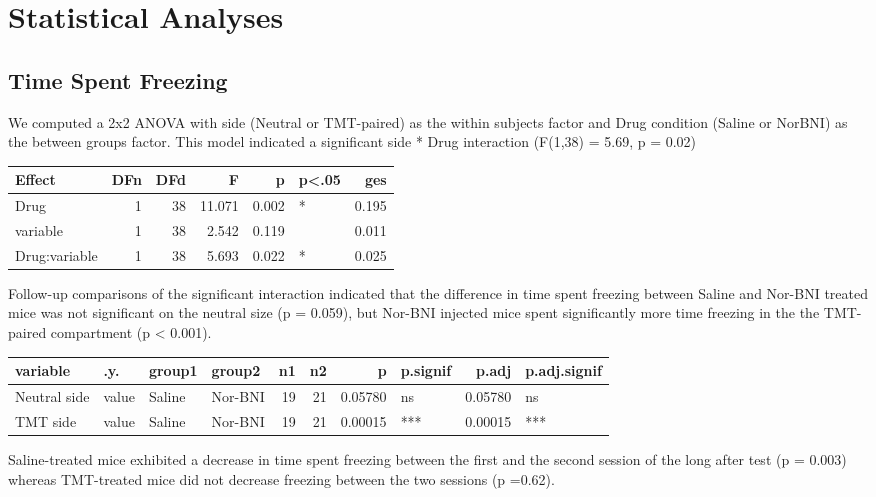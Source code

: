 \documentclass[
]{book}
\begin{document}
\hypertarget{statistical-analyses-3}{%
\section{Statistical Analyses}\label{statistical-analyses-3}}

\hypertarget{time-spent-freezing}{%
\subsection{Time Spent Freezing}\label{time-spent-freezing}}

We computed a 2x2 ANOVA with side (Neutral or TMT-paired) as the within subjects factor and Drug condition (Saline or NorBNI) as the between groups factor. This model indicated a significant side * Drug interaction (F(1,38) = 5.69, p = 0.02)

\begin{tabular}{l|r|r|r|r|l|r}
\hline
Effect & DFn & DFd & F & p & p<.05 & ges\\
\hline
Drug & 1 & 38 & 11.071 & 0.002 & * & 0.195\\
\hline
variable & 1 & 38 & 2.542 & 0.119 &  & 0.011\\
\hline
Drug:variable & 1 & 38 & 5.693 & 0.022 & * & 0.025\\
\hline
\end{tabular}

Follow-up comparisons of the significant interaction indicated that the difference in time spent freezing between Saline and Nor-BNI treated mice was not significant on the neutral size (p = 0.059), but Nor-BNI injected mice spent significantly more time freezing in the the TMT-paired compartment (p \textless{} 0.001).

\begin{tabular}{l|l|l|l|r|r|r|l|r|l}
\hline
variable & .y. & group1 & group2 & n1 & n2 & p & p.signif & p.adj & p.adj.signif\\
\hline
Neutral side & value & Saline & Nor-BNI & 19 & 21 & 0.05780 & ns & 0.05780 & ns\\
\hline
TMT side & value & Saline & Nor-BNI & 19 & 21 & 0.00015 & *** & 0.00015 & ***\\
\hline
\end{tabular}

Saline-treated mice exhibited a decrease in time spent freezing between the first and the second session of the long after test (p = 0.003) whereas TMT-treated mice did not decrease freezing between the two sessions (p =0.62).
\end{document}
